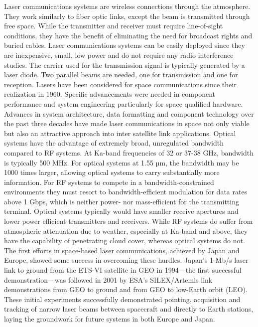 
Laser communications systems are wireless connections through the atmosphere. They work similarly to fiber optic links, except the beam is transmitted through free space. While the transmitter and receiver must require line-of-sight conditions, they have the benefit of eliminating the need for broadcast rights and buried cables.
 Laser communications systems can be easily deployed since they are inexpensive, small, low power and do not require any radio interference studies. The carrier used for the transmission signal is typically generated by a laser diode. Two parallel beams are needed, one for transmission and one for reception. 
Lasers have been considered for space communications since their realization in 1960. Specific advancements were needed in component performance and system engineering particularly for space qualified hardware. Advances in system architecture, data formatting and component technology over the past three decades have made laser communications in space not only viable but also an attractive approach into inter satellite link applications.
Optical systems have the advantage of extremely broad, unregulated bandwidth compared to RF systems. At Ka-band frequencies of 32 or 37-38 GHz, bandwidth is typically 500 MHz. For optical systems at 1.55 µm, the bandwidth may be 1000 times larger, allowing optical systems to carry substantially more information. For RF systems to compete in a bandwidth-constrained environments they must resort to bandwidth-efficient modulation for data rates above 1 Gbps, which is neither power- nor mass-efficient for the transmitting terminal. Optical systems typically would have smaller receive apertures and lower power efficient transmitters and receivers. While RF systems do suffer from atmospheric attenuation due to weather, especially at Ka-band and above, they have the capability of penetrating cloud cover, whereas optical systems do not.
The first efforts in space-based laser communications, achieved by Japan and Europe, showed some success in overcoming these hurdles. Japan's 1-Mb/s laser link to ground from the ETS-VI satellite in GEO in 1994—the first successful demonstration—was followed in 2001 by ESA’s SILEX/Artemis link demonstrations from GEO to ground and from GEO to low-Earth orbit (LEO). These initial experiments successfully demonstrated pointing, acquisition and tracking of narrow laser beams between spacecraft and directly to Earth stations, laying the groundwork for future systems in both Europe and Japan.
